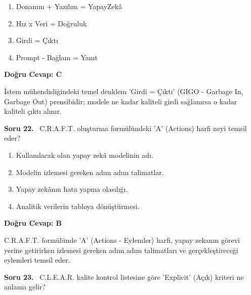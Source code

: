 \documentclass[11pt,a4paper,openany]{book}
\begin{document}
\begin{enumerate}[label=\Alph*), leftmargin=25pt, topsep=4pt, itemsep=2pt]
        \item Donanım + Yazılım = YapayZekâ
        \item Hız x Veri = Doğruluk
        \item Girdi = Çıktı
        \item Prompt - Bağlam = Yanıt
\end{enumerate}

\vspace{4pt}
\begin{tcolorbox}[title=Cevap ve Açıklama, colback=gray!3!white, colframe=primarycolor!90!black, arc=2mm, fonttitle=\bfseries\sffamily, top=6pt, bottom=6pt]
    \textbf{Doğru Cevap: C}

    \vspace{2pt}
    İstem mühendisliğindeki temel denklem 'Girdi = Çıktı' (GIGO - Garbage In, Garbage Out) prensibidir; modele ne kadar kaliteli girdi sağlanırsa o kadar kaliteli çıktı alınır.
\end{tcolorbox}
\vspace{10pt}
\needspace{5cm}
\vspace{8pt}
\noindent\textbf{\large\sffamily Soru 22.} \ C.R.A.F.T. oluşturma formülündeki 'A' (Actions) harfi neyi temsil eder?

\begin{enumerate}[label=\Alph*), leftmargin=25pt, topsep=4pt, itemsep=2pt]
        \item Kullanılacak olan yapay zekâ modelinin adı.
        \item Modelin izlemesi gereken adım adım talimatlar.
        \item Yapay zekânın hata yapma olasılığı.
        \item Analitik verilerin tabloya dönüştürmesi.
\end{enumerate}

\vspace{4pt}
\begin{tcolorbox}[title=Cevap ve Açıklama, colback=gray!3!white, colframe=primarycolor!90!black, arc=2mm, fonttitle=\bfseries\sffamily, top=6pt, bottom=6pt]
    \textbf{Doğru Cevap: B}

    \vspace{2pt}
    C.R.A.F.T. formülünde 'A' (Actions - Eylemler) harfi, yapay zekanın görevi yerine getirirken izlemesi gereken adım adım talimatları ve gerçekleştireceği eylemleri temsil eder.
\end{tcolorbox}
\vspace{10pt}
\needspace{5cm}
\vspace{8pt}
\noindent\textbf{\large\sffamily Soru 23.} \ C.L.E.A.R. kalite kontrol listesine göre 'Explicit' (Açık) kriteri ne anlama gelir?
\end{document}
